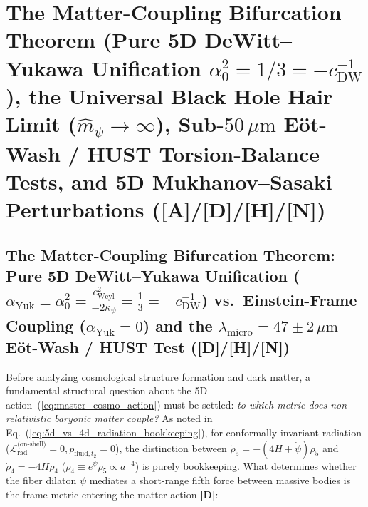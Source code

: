 \documentclass[11pt,a4paper]{article}
\newcommand{\catA}{\textbf{\textcolor{purple!80!black}{[A]}}}
\newcommand{\catD}{\textbf{\textcolor{blue!75!black}{[D]}}}
\newcommand{\catH}{\textbf{\textcolor{orange!85!black}{[H]}}}
\newcommand{\catN}{\textbf{\textcolor{teal!75!black}{[N]}}}
\theoremstyle{plain}
\theoremstyle{definition}
\theoremstyle{remark}
\numberwithin{equation}{section}
\begin{document}
\section{\texorpdfstring{The Matter-Coupling Bifurcation Theorem (Pure 5D DeWitt--Yukawa Unification $\alpha_0^2 = 1/3 = -c_{\text{DW}}^{-1}$), the Universal Black Hole Hair Limit ($\hat{m}_{\psi} \to \infty$), Sub-$50\,\mu\text{m}$ E\"ot-Wash / HUST Torsion-Balance Tests, and 5D Mukhanov--Sasaki Perturbations (\catA/\catD/\catH/\catN)}{The Matter-Coupling Bifurcation Theorem, the Universal Black Hole Hair Limit, Sub-50 um Eot-Wash / HUST Torsion-Balance Tests, and 5D Mukhanov-Sasaki Perturbations}}

\subsection{\texorpdfstring{The Matter-Coupling Bifurcation Theorem: Pure 5D DeWitt--Yukawa Unification ($\alpha_{\text{Yuk}} \equiv \alpha_0^2 = \frac{c_{\text{Weyl}}^2}{-2\kappa_{\psi}} = \frac{1}{3} = -c_{\text{DW}}^{-1}$) vs.\ Einstein-Frame Coupling ($\alpha_{\text{Yuk}} = 0$) and the $\lambda_{\text{micro}} = 47 \pm 2\,\mu\text{m}$ E\"ot-Wash / HUST Test (\catD/\catH/\catN)}{The Matter-Coupling Bifurcation Theorem: Pure 5D DeWitt-Yukawa Unification vs. Einstein-Frame Coupling and the 47 +- 2 um Eot-Wash / HUST Test ([D]/[H]/[N])}}

Before analyzing cosmological structure formation and dark matter, a fundamental structural question about the 5D action~(\ref{eq:master_cosmo_action}) must be settled: \textit{to which metric does non-relativistic baryonic matter couple?} As noted in Eq.~(\ref{eq:5d_vs_4d_radiation_bookkeeping}), for conformally invariant radiation ($\mathcal{L}_{\text{rad}}^{\text{(on-shell)}} = 0, p_{\text{fluid},t_2} = 0$), the distinction between $\dot{\rho}_5 = -(4H + \dot{\psi})\rho_5$ and $\dot{\rho}_4 = -4H\rho_4$ ($\rho_4 \equiv e^{\psi}\rho_5 \propto a^{-4}$) is purely bookkeeping. What determines whether the fiber dilaton $\psi$ mediates a short-range fifth force between massive bodies is the frame metric entering the matter action \catD:
\end{document}
